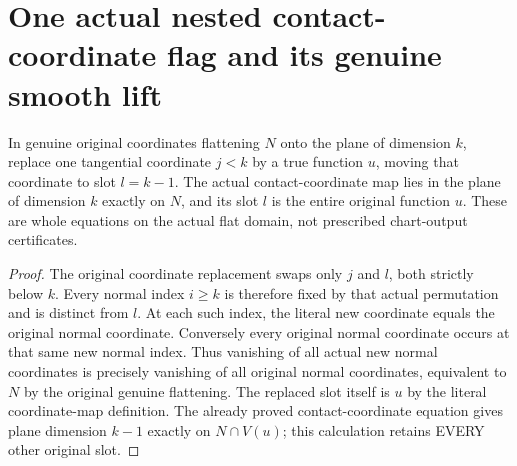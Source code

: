 \section{One actual nested contact-coordinate flag and its genuine smooth lift}

\begin{lemma}
\label{hir:submersion-contact-coordinates-original-flag}
\leanok
In genuine original coordinates flattening $N$ onto the plane of dimension
$k$, replace one tangential coordinate $j<k$ by a true function $u$, moving
that coordinate to slot $l=k-1$. The actual contact-coordinate map lies in
the plane of dimension $k$ exactly on $N$, and its slot $l$ is the entire
original function $u$. These are whole equations on the actual flat domain,
not prescribed chart-output certificates.
\end{lemma}
\begin{proof}
The original coordinate replacement swaps only $j$ and $l$, both strictly
below $k$. Every normal index $i\geq k$ is therefore fixed by that actual
permutation and is distinct from $l$. At each such index, the literal new
coordinate equals the original normal coordinate. Conversely every original
normal coordinate occurs at that same new normal index. Thus vanishing of
all actual new normal coordinates is precisely vanishing of all original
normal coordinates, equivalent to $N$ by the original genuine flattening.
The replaced slot itself is $u$ by the literal coordinate-map definition.
The already proved contact-coordinate equation gives plane dimension $k-1$
exactly on $N\cap V(u)$; this calculation retains EVERY other original slot.
\end{proof}

